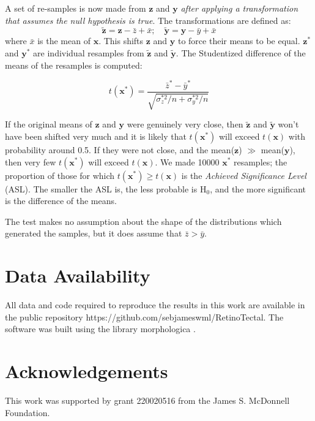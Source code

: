 \documentclass[9pt,lineno,draft]{elife}
\begin{document}
A set of re-samples is now made from $\textbf{z}$ and $\textbf{y}$ \emph{after applying a transformation that assumes the null hypothesis is true}.
The transformations are defined as:
%
$$ \tilde{\textbf{z}} = \textbf{z} - \bar{z} + \bar{x}; \quad \tilde{\textbf{y}} = \textbf{y} - \bar{y} + \bar{x} $$
%
where $\bar{x}$ is the mean of $\textbf{x}$. This shifts $\textbf{z}$ and $\textbf{y}$ to force their means to be equal.
$\textbf{z}^*$ and $\textbf{y}^*$ are individual resamples from $\tilde{\textbf{z}}$ and $\tilde{\textbf{y}}$.
The Studentized difference of the means of the resamples is computed:

$$t(\textbf{x}^*) =  \frac{\bar{z}^* - \bar{y}^*}{\sqrt{\sigma_{z}^{*2}/n + \sigma_{y}^{*2}/n} } $$

If the original means of $\textbf{z}$ and $\textbf{y}$ were genuinely very close, then $\tilde{\textbf{z}}$ and $\tilde{\textbf{y}}$ won't have been shifted very much and it is likely that $t(\textbf{x}^*)$ will exceed $t(\textbf{x})$ with probability around 0.5.
If they were not close, and the mean($\textbf{z}$) $\gg$ mean($\textbf{y}$), then very few $t(\textbf{x}^*)$ will exceed $t(\textbf{x})$.
We made 10000 $\textbf{x}^*$ resamples; the proportion of those for which $t(\textbf{x}^*) \geq t(\textbf{x})$ is the \emph{Achieved Significance Level} (ASL).
The smaller the ASL is, the less probable is H$_0$, and the more significant is the difference of the means.

The test makes no assumption about the shape of the distributions which generated the samples, but it does assume that $\bar{z} > \bar{y}$.

\section{Data Availability}

All data and code required to reproduce the results in this work are available in the public repository
{https://github.com/sebjameswml/RetinoTectal}.
The software was built using the library morphologica \citep{james_morphologica_2022}.

\section{Acknowledgements}

This work was supported by grant 220020516 from the James S. McDonnell Foundation.


\end{document}
